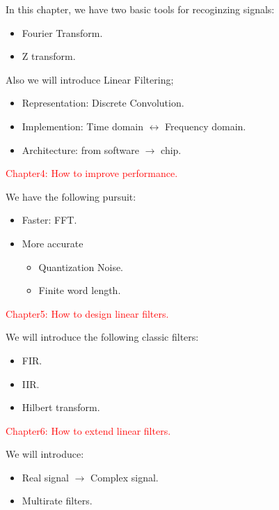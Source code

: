         In this chapter, we have two basic tools for recoginzing signals:
            \begin{itemize}
                \item Fourier Transform.
                \item Z transform.
            \end{itemize}
        Also we will introduce Linear Filtering;
            \begin{itemize}
                \item Representation: Discrete Convolution.
                \item Implemention: Time domain $\longleftrightarrow$ Frequency domain.
                \item Architecture: from software $ \longrightarrow$ chip.
            \end{itemize}
        
        \newpage
        \noindent \textcolor{red}{Chapter4: How to improve performance.}

        We have the following pursuit:
            \begin{itemize}
                \item Faster: FFT.
                \item More accurate
                    \begin{itemize}
                        \item Quantization Noise.
                        \item Finite word length.
                    \end{itemize}
            \end{itemize}
        
        \noindent \textcolor{red}{Chapter5: How to design linear filters.}

        We will introduce the following classic filters:
            \begin{itemize}
                \item FIR.
                \item IIR.
                \item Hilbert transform.
            \end{itemize}
        
        \noindent \textcolor{red}{Chapter6: How to extend linear filters.}

        We will introduce:
            \begin{itemize}
                \item Real signal $\longrightarrow$ Complex signal.
                \item Multirate filters.
            \end{itemize}
        

